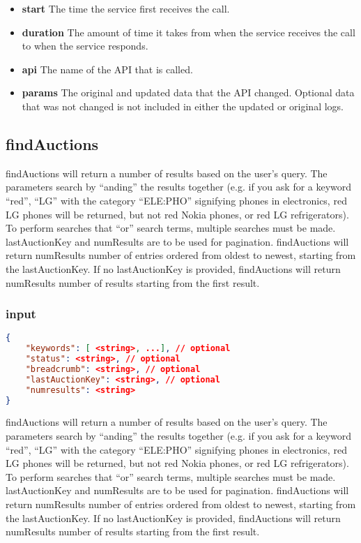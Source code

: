 \documentclass[12pt,a4paper]{article}
\begin{document}
\begin{itemize}
    \item \textbf{start} The time the service first receives the call.
    \item \textbf{duration} The amount of time it takes from when the service
        receives the call to when the service responds.
    \item \textbf{api} The name of the API that is called.
    \item \textbf{params} The original and updated data that the API changed.
        Optional data that was not changed is not included in either the
        updated or original logs.
\end{itemize}



\subsection{findAuctions}
findAuctions will return a number of results based on the user's query. The
parameters search by ``anding'' the results together (e.g. if you ask for a
keyword ``red'', ``LG'' with the category ``ELE:PHO'' signifying phones in
electronics, red LG phones will be returned, but not red Nokia phones, or red
LG refrigerators). To perform searches that ``or'' search terms, multiple
searches must be made. lastAuctionKey and numResults are to be used for
pagination. findAuctions will return numResults number of entries ordered from
oldest to newest, starting from the lastAuctionKey. If no lastAuctionKey is
provided, findAuctions will return numResults number of results starting from
the first result.

\subsubsection{input}
\begin{lstlisting}[language=json,firstnumber=1]
{
    "keywords": [ <string>, ...], // optional
    "status": <string>, // optional
    "breadcrumb": <string>, // optional
    "lastAuctionKey": <string>, // optional
    "numresults": <string>
}
\end{lstlisting}

findAuctions will return a number of results based on the user's query. The
parameters search by ``anding'' the results together (e.g. if you ask for a
keyword ``red'', ``LG'' with the category ``ELE:PHO'' signifying phones in
electronics, red LG phones will be returned, but not red Nokia phones, or red
LG refrigerators). To perform searches that ``or'' search terms, multiple
searches must be made. lastAuctionKey and numResults are to be used for
pagination. findAuctions will return numResults number of entries ordered from
oldest to newest, starting from the lastAuctionKey. If no lastAuctionKey is
provided, findAuctions will return numResults number of results starting from
the first result.
\end{document}
